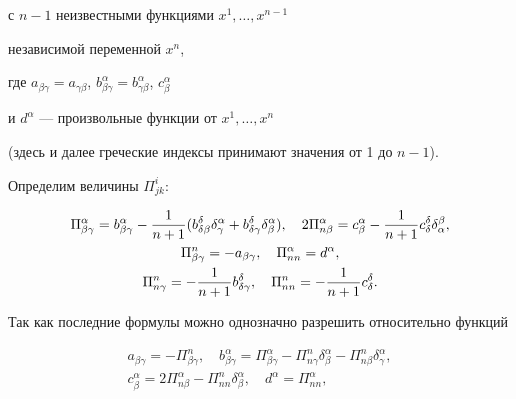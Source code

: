 с $n-1$ неизвестными функциями $x^{1},\dotsc,x^{n-1}$


независимой переменной $x^{n}$,


где $a_{\beta\gamma}=a_{\gamma\beta}$, $ b^\alpha_{\beta\gamma}=


b^\alpha_{\gamma\beta}$, $ c^\alpha_{\beta}$ 


и $ d^\alpha$ --- произвольные функции от $x^1,\dotsc,x^n$


(здесь и далее греческие индексы принимают значения от 1 до $n-1$).


Определим величины $\Pi^{i}_{jk}$:


\begin{gather}


\Pi_{\beta \gamma}^\alpha = b_{\beta \gamma}^\alpha -


\frac{1}{n+1}


(b_{\delta \beta}^\delta \delta_{\gamma}^\alpha+b_{\delta \gamma}^\delta


\delta_\beta^\alpha), \quad


2\Pi_{n\beta}^\alpha=c_\beta^\alpha-\frac{1}{n+1}


c_\delta ^\delta \delta_\alpha^\beta,\notag \\


%


\label{a2}


\Pi_{\beta \gamma}^n =- a_{\beta \gamma}, \quad


\Pi_{nn}^\alpha=d^\alpha,\\


%


\Pi_{n\gamma}^n =-\frac{1}{n+1}b_{\delta\gamma}^\delta,\quad


\Pi_{nn}^n=-\frac{1}{n+1}c_{\delta}^\delta.\notag


\end{gather}


Так как последние формулы можно однозначно разрешить относительно функций


\begin{equation}\label{a3}\begin{array}{c}


a_{\beta \gamma}=-\Pi_{\beta \gamma}^n,\quad


 b_{\beta \gamma}^\alpha=\Pi_{\beta \gamma}^\alpha - \Pi_{n\gamma}^n


\delta_{\beta}^\alpha - \Pi_{n\beta}^n \delta_\gamma^\alpha,\\[2mm]


c_\beta^\alpha=2\Pi_{n\beta}^\alpha-\Pi_{nn}^n\delta_\beta^\alpha,\quad


d^\alpha=\Pi_{nn}^\alpha,


\end{array}


\end{equation}


